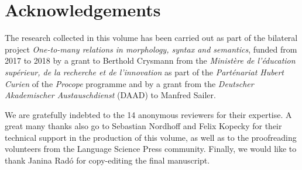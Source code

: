 \documentclass[output=paper]{langscibook}
\begin{document}
\section*{Acknowledgements}

The research collected in this volume has been carried out as
part of the bilateral project \textit{One-to-many relations in
  morphology, syntax and semantics}, funded from 2017 to 2018 by a
grant to Berthold Crysmann from the \textit{Ministère de l'éducation
  supérieur, de la recherche et de l'innovation} as part of the
\textit{Parténariat Hubert Curien} of the \textit{Procope} programme
and by a grant from the \textit{Deutscher Akademischer
  Austauschdienst} (DAAD) to Manfred Sailer.

We are gratefully indebted to the 14 anonymous reviewers for their
expertise. A great many thanks also go to Sebastian Nordhoff and Felix
Kopecky for their
technical support in the production of this volume, as well as to the
proofreading volunteers from the Language Science Press
community. Finally, we would like to thank Janina Radó for
copy-editing the final manuscript.

\printbibliography[heading=subbibliography,notkeyword=this]
\end{document}
